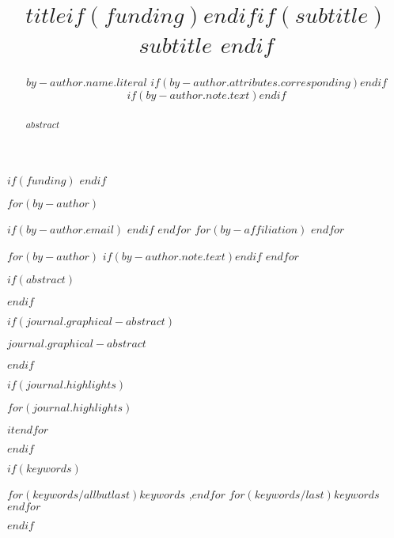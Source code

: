 
\begin{frontmatter}
    
\title{$title$$if(funding)$$endif$$if(subtitle)$\\\large{$subtitle$} $endif$}
$if(funding)$
$endif$

$for(by-author)$\author[$for(by-author.affiliations)$$it.number$$sep$,$endfor$]{$by-author.name.literal$%
$if(by-author.attributes.corresponding)$$endif$%
$if(by-author.note.text)$$endif$}
$if(by-author.email)$  $endif$
$endfor$
$for(by-affiliation)$
$endfor$

$for(by-author)$
$if(by-author.note.text)$$endif$
$endfor$
        
$if(abstract)$
\begin{abstract}
$abstract$
\end{abstract}
$endif$

$if(journal.graphical-abstract)$\begin{graphicalabstract}
$journal.graphical-abstract$
\end{graphicalabstract}
$endif$

$if(journal.highlights)$\begin{highlights}
$for(journal.highlights)$\item $it$$endfor$
\end{highlights}
$endif$

$if(keywords)$
\begin{keyword}
    $for(keywords/allbutlast)$$keywords$ \sep $endfor$
    $for(keywords/last)$$keywords$$endfor$
\end{keyword}
$endif$
\end{frontmatter}
    